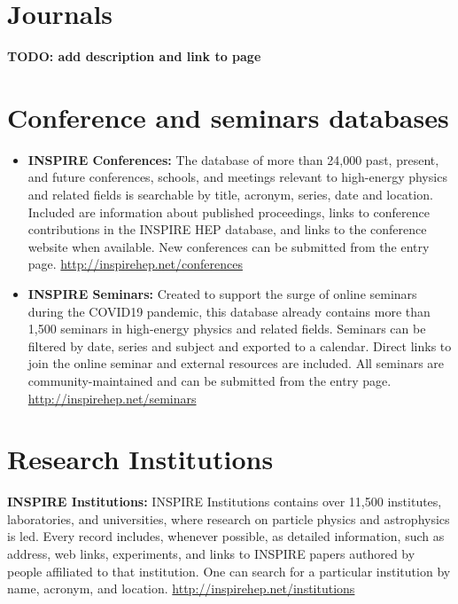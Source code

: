 \section{Journals}\label{databases:sec:journals}

\textbf{TODO: add description and link to page}

\section{Conference and seminars databases}\label{databases:sec:conference}
\begin{itemize}
\tightlist
{}
\item
  \textbf{INSPIRE Conferences:} The database of more than 24,000 past,
  present, and future conferences, schools, and meetings relevant to
  high-energy physics and related fields is searchable by title,
  acronym, series, date and location. Included are information about
  published proceedings, links to conference contributions in the
  INSPIRE HEP database, and links to the conference website when
  available. New conferences can be submitted from the entry page.
  \url{http://inspirehep.net/conferences}
\item
  \textbf{INSPIRE Seminars:} Created to support the surge of online seminars during
  the COVID19 pandemic, this database already contains more than 1,500
  seminars in high-energy physics and related fields. Seminars can be filtered
  by date, series and subject and exported to a calendar. Direct links to join
  the online seminar and external resources are included. All seminars are
  community-maintained and can be submitted from the entry page.
  \url{http://inspirehep.net/seminars}
\end{itemize}

\section{Research Institutions}\label{databases:sec:research}

  \textbf{INSPIRE Institutions:} INSPIRE Institutions contains over
  11,500 institutes, laboratories, and universities, where research on
  particle physics and astrophysics is led. Every record includes,
  whenever possible, as detailed information, such as address, web
  links, experiments, and links to INSPIRE papers authored by people
  affiliated to that institution. One can search for a particular
  institution by name, acronym, and location.
  \url{http://inspirehep.net/institutions}

